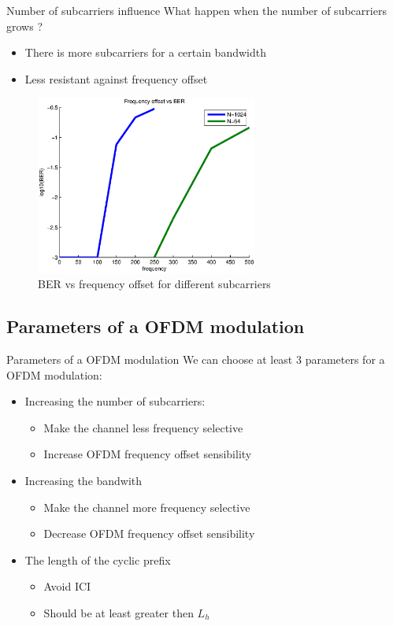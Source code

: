 \documentclass{beamer}
\begin{document}
\begin{frame}{Number of subcarriers influence}
	What happen  when the number of subcarriers grows ?
	\begin{itemize}
		\item There is more subcarriers for a certain bandwidth
		\item Less resistant against frequency offset
	\end{itemize} 
		\begin{figure}[h!]
			\centering
			\includegraphics[width = 0.65\textwidth]{fber.eps}
			\caption{BER vs frequency offset for different subcarriers}
		\end{figure}	
\end{frame}

\subsection{Parameters of a OFDM modulation}
\begin{frame}{Parameters of a OFDM modulation}
	We can choose at least 3 parameters for a OFDM modulation:	
	\begin{itemize}
		\item Increasing the number of subcarriers:
			\begin{itemize}
				\item Make the channel less frequency selective
				\item Increase OFDM frequency offset sensibility
			\end{itemize}
		\item Increasing the bandwith
			\begin{itemize}
				\item Make the channel more frequency selective
				\item Decrease OFDM frequency offset sensibility
			\end{itemize}
		\item The length of the cyclic prefix
			\begin{itemize}
				\item Avoid ICI
				\item Should be at least greater then $L_h$
			\end{itemize}
	\end{itemize}
\end{frame}
\end{document}
